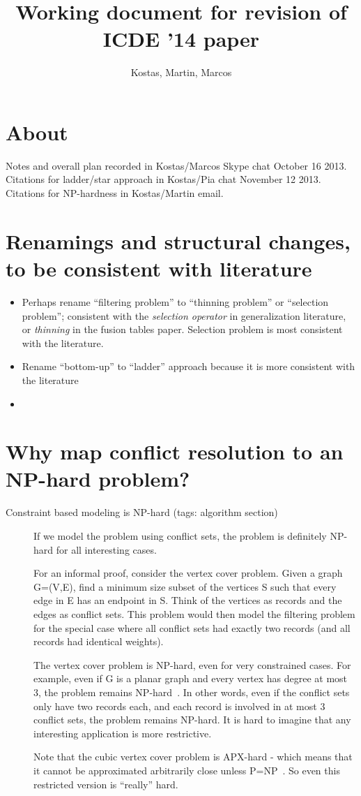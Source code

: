 \documentclass[11pt, oneside]{article}   	%
\title{Working document for revision of ICDE '14 paper}
\author{Kostas, Martin, Marcos}
\begin{document}
\maketitle

\section{About}
Notes and overall plan recorded in Kostas/Marcos Skype chat October 16 2013. Citations for ladder/star approach in Kostas/Pia chat November 12 2013. Citations for NP-hardness in Kostas/Martin email.

\section{Renamings and structural changes, to be consistent with literature}

\begin{itemize}
\item Perhaps rename ``filtering problem'' to ``thinning problem'' or ``selection problem''; consistent with the \emph{selection operator} in generalization literature, or \emph{thinning} in the fusion tables paper. Selection problem is most consistent with the literature.
\item Rename ``bottom-up'' to ``ladder'' approach because it is more consistent with the literature~\cite{foerster2010challenges}
\item 
\end{itemize}

\section{Why map conflict resolution to an NP-hard problem?}

\begin{description}
\item[Constraint based modeling is NP-hard (tags: algorithm section)] If we model the problem using conflict sets, the problem is
definitely NP-hard for all interesting cases.

For an informal proof, consider the vertex cover problem. Given a graph G=(V,E),
find a minimum size subset of the vertices S such that every edge in E
has an endpoint in S. Think of the vertices as records and the edges
as conflict sets. This problem would then model the filtering problem
for the special case where all conflict sets had exactly two records
(and all records had identical weights).

The vertex cover problem is NP-hard, even for very constrained cases.
For example, even if G is a planar graph and every vertex has degree
at most 3, the problem remains NP-hard~\cite{garey1977rectilinear}. In other words, even if the
conflict sets only have two records each, and each record is involved
in at most 3 conflict sets, the problem remains NP-hard. It is hard to
imagine that any interesting application is more restrictive.

Note that the cubic vertex cover problem is APX-hard - which
means that it cannot be approximated arbitrarily close unless P=NP~\cite{alimonti2000some}. So even this restricted version is ``really'' hard.
\end{description}
\end{document}

